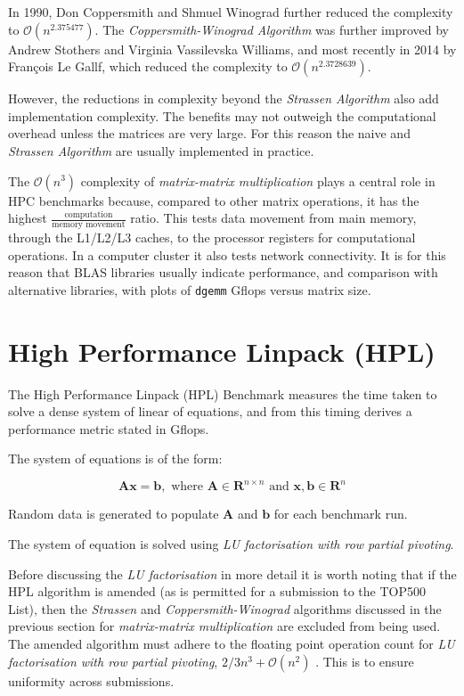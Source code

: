 In 1990, Don Coppersmith and Shmuel Winograd further reduced the complexity to $\mathcal{O}(n^{2.375477})$. The \emph{Coppersmith-Winograd Algorithm} was further improved by Andrew Stothers and Virginia Vassilevska Williams, and most recently in 2014 by François Le Gallf, which reduced the complexity to $\mathcal {O}(n^{2.3728639})$.

However, the reductions in complexity beyond the \emph{Strassen Algorithm} also add implementation complexity. The benefits may not outweigh the computational overhead unless the matrices are very large. For this reason the naive and \emph{Strassen Algorithm} are usually implemented in practice.    

The $\mathcal{O}(n^3)$ complexity of \emph{matrix-matrix multiplication} plays a central role in HPC benchmarks because, compared to other matrix operations, it has the highest $\frac{\text{computation}}{\text{memory movement}}$ ratio. This tests data movement from main memory, through the L1/L2/L3 caches, to the processor registers for computational operations. In a computer cluster it also tests network connectivity. It is for this reason that BLAS libraries usually indicate performance, and comparison with alternative libraries, with plots of \verb|dgemm| Gflops versus matrix size.


%
%
\section{High Performance Linpack (HPL)}

The High Performance Linpack (HPL) Benchmark \cite{linpack-ppf} measures the time taken to solve a dense system of linear of equations, and from this timing derives a performance metric stated in Gflops. 

The system of equations is of the form:

\begin{equation}
\mathbf{Ax} = \mathbf{b},\text{ where }\mathbf{A} \in \mathbf{R}^{n\times n}\text{ and }\mathbf{x}, \mathbf{b} \in \mathbf{R}^n
\end{equation} 

Random data is generated to populate $\mathbf{A}$ and $\mathbf{b}$ for each benchmark run.

The system of equation is solved using \emph{LU factorisation with row partial pivoting}.

Before discussing the \emph{LU factorisation} in more detail it is worth noting that if the HPL algorithm is amended (as is permitted for a submission to the TOP500 List), then the \emph{Strassen} and \emph{Coppersmith-Winograd} algorithms discussed in the previous section for \emph{matrix-matrix multiplication} are excluded from being used. The amended algorithm must adhere to the floating point operation count for \emph{LU factorisation with row partial pivoting}, $2/3n^3 + \mathcal{O}(n^2)$ \cite{linpack-ppf}. This is to ensure uniformity across submissions. 

